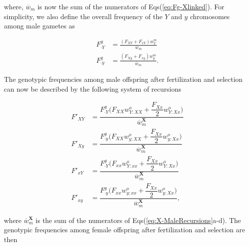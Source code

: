 \documentclass{article}
\begin{document}
\noindent where, $\overline{w}_{m}$ is now the sum of the numerators of Eqs(\ref{eq:Fg-Xlinked}). For simplicity, we also define the overall frequency of the $Y$ and $y$ chromosomes among male gametes as 

 \begin{subequations}\begin{align} \label{eq:qg-Xlinked}
	F_{\cdot Y}^{g} &= \frac{(F_{XY} + F_{xY})w^{m}_{Y}}{\overline{w}_{m}} \\
	F_{\cdot y}^{g} &= \frac{(F_{Xy} + F_{xy})w^{m}_{y}}{\overline{w}_{m}}. 
\end{align}\end{subequations}

The genotypic frequencies among male offspring after fertilization and selection can now be described by the following system of recursions

\begin{subequations}\label{eq:X-MaleRecursions} 
	\begin{align} 
		F'_{XY} &= \dfrac{ F_{\cdot Y}^g \bigg(F_{XX} w^{o}_{Y:XX} + \dfrac{F_{Xx}}{2} w^{o}_{Y:Xx} \bigg)}{\overline{w}^{\mathbf{X}}_{m}} \label{eq:X-XYRec1} \\ 
		F'_{Xy} &= \dfrac{ F_{\cdot y}^g \bigg(F_{XX} w^{o}_{y:XX} + \dfrac{F_{Xx}}{2} w^{o}_{y:Xx} \bigg)}{\overline{w}^{\mathbf{X}}_{m}} \label{eq:X-XyRec2} \\ 
		F'_{xY} &= \dfrac{ F_{\cdot Y}^g \bigg(F_{xx} w^{o}_{Y:xx} + \dfrac{F_{Xx}}{2} w^{o}_{Y:Xx} \bigg)}{\overline{w}^{\mathbf{X}}_{m}} \label{eq:X-xYRec3} \\ 
		F'_{xy} &= \dfrac{ F_{\cdot y}^g \bigg(F_{xx} w^{o}_{y:xx} + \dfrac{F_{Xx}}{2} w^{o}_{y:Xx} \bigg)}{\overline{w}^{\mathbf{X}}_{m}}, \label{eq:X-xyRec4}
	\end{align}
\end{subequations}

\noindent where $\overline{w}^{\mathbf{X}}_{m}$ is the sum of the numerators of Eqs(\ref{eq:X-MaleRecursions}a-d). The genotypic frequencies among female offspring after fertilization and selection are then
\end{document}
